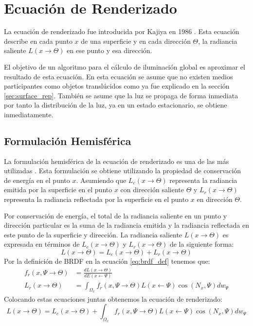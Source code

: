\section{Ecuación de Renderizado}
La ecuación de renderizado fue introducida por Kajiya  en 1986 \cite{kajiya86}. Esta ecuación describe en cada punto $x$ de una superficie y en cada dirección $\Theta$, la radiancia saliente $L(x\to\Theta)$ en ese punto y esa dirección.

El objetivo de un algoritmo para el cálculo de iluminación global es aproximar el resultado de esta ecuación. En esta ecuación se asume que no existen medios participantes como objetos translúcidos como ya fue explicado en la sección \ref{sec:surface_rep}. También se asume que la luz se propaga de forma inmediata por tanto la distribución de la luz, ya en un estado estacionario, se obtiene inmediatamente. 

\subsection{Formulación Hemisférica}
La formulación hemisférica de la ecuación de renderizado es una de las más utilizadas \cite{advanced_gi2006}. Esta formulación se obtiene utilizando la propiedad de conservación de energía en el punto $x$. Asumiendo que $L_{e}(x\to\Theta)$ representa la radiancia emitida por la superficie en el punto $x$ con dirección saliente $\Theta$ y $L_{r}(x\to\Theta)$ representa la radiancia reflectada por la superficie en el punto $x$ en dirección $\Theta$.

Por conservación de energía, el total de la radiancia saliente en un punto y dirección particular es la suma de la radiancia emitida y la radiancia reflectada en este punto de la superficie y dirección. La radiancia saliente $L(x\to\Theta)$ es expresada en términos de $L_{e}(x\to\Theta)$ y $L_{r}(x\to\Theta)$ de la siguiente forma:
\begin{equation}
    L(x\to\Theta) = L_{e}(x\to\Theta) + L_{r}(x\to\Theta)
    \label{eq:reflectance}
\end{equation}
Por la definición de \ac{BRDF} en la ecuación \ref{eq:brdf_def} tenemos que:
\begin{equation}
	\begin{split}
        f_{r}(x, \Psi\to\Theta) &= \frac{dL(x\to\Theta)}{dE(x\gets\Psi)}\\
        L_{r}(x\to\Theta) &= \int_{\Omega_{x}}{f_{r}(x, \Psi\to\Theta)L(x\gets\Psi)\cos(N_{x}, \Psi)dw_{\Psi}}
	\end{split}
	\label{eq:rendering_eq_LR}
\end{equation}
Colocando estas ecuaciones juntas obtenemos la ecuación de renderizado:
\begin{equation}
    L(x\to\Theta) = L_{e}(x\to\Theta) + \int_{\Omega_{x}}{f_{r}(x, \Psi\to\Theta)L(x\gets\Psi)\cos(N_{x}, \Psi)dw_{\Psi}}
    \label{eq:rendering_eq}
\end{equation}

